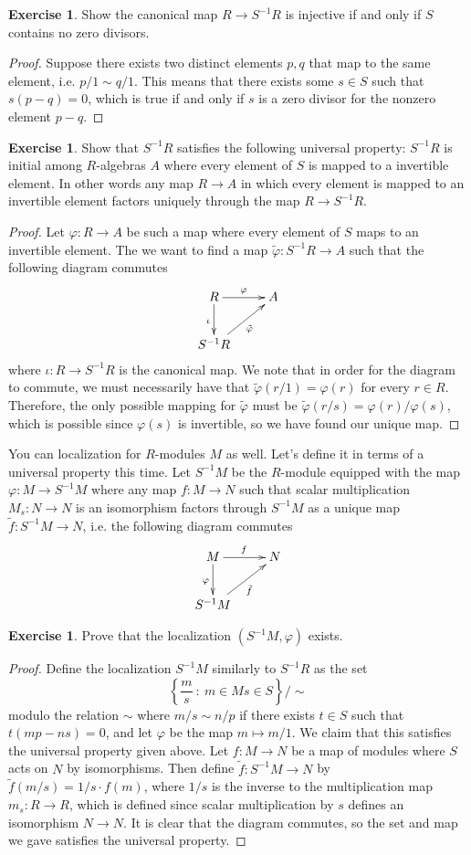 \documentclass[psamsfonts]{amsart}
\theoremstyle{definition}
\newtheorem{exer}[thm]{Exercise}
\theoremstyle{remark}
\newcommand{\inv}{^{-1}}
\newcommand{\set}[1]{\left\lbrace #1 \right\rbrace}
\begin{document}
%
\begin{exer}
Show the canonical map $R \to S\inv R$ is injective if and only if $S$ contains no zero divisors.
\end{exer}
%
\begin{proof}
Suppose there exists two distinct elements $p,q$ that map to the same element, i.e. $p/1 \sim q/1$. This means that there exists some $s \in S$ such that $s(p-q) = 0$, which is true if and only if $s$ is a zero divisor for the nonzero element $p-q$.
\end{proof}
%
\begin{exer}
Show that $S\inv R$ satisfies the following universal property: $S\inv R$ is initial among $R$-algebras $A$ where every element of $S$ is mapped to a invertible element. In other words any map $R \to A$ in which every element is mapped to an invertible element factors uniquely through the map $R \to S\inv R$.
\end{exer}
%
\begin{proof}
Let $\varphi : R \to A$ be such a map where every element of $S$ maps to an invertible element. The we want to find a map $\tilde{\varphi}: S\inv R \to A$ such that the following diagram commutes
$$\xymatrix{
R \ar[d]_{\iota}\ar[r]^{\varphi} & A \\
S\inv R \ar[ur]_{\tilde{\varphi}}
}$$
where $\iota : R \to S\inv R$ is the canonical map. We note that in order for the diagram to commute, we must necessarily have that $\tilde{\varphi}(r/1) = \varphi(r)$ for every $r \in R$. Therefore, the only possible mapping for $\tilde{\varphi}$ must be $\tilde{\varphi}(r/s) = \varphi(r) / \varphi(s)$, which is possible since $\varphi(s)$ is invertible, so we have found our unique map.
\end{proof}
You can localization for $R$-modules $M$ as well. Let's define it in terms of a universal property this time. Let $S\inv M$ be the $R$-module equipped with the map $\varphi : M \to S\inv M$ where any map $f: M \to N$ such that scalar multiplication $M_s: N \to N$ is an isomorphism factors through $S\inv M$ as a unique map $\tilde{f}: S\inv M \to N$, i.e. the following diagram commutes
$$\xymatrix{
M \ar[d]_{\varphi}\ar[r]^f & N \\
S\inv M \ar[ur]_{\tilde{f}}
}$$
%
\begin{exer}
Prove that the localization $(S\inv M, \varphi)$ exists.
\end{exer}
%
\begin{proof}
Define the localization $S\inv M$ similarly to $S\inv R$ as the set
$$\set{\frac{m}{s} ~:~ m \in M s \in S} / \sim $$
modulo the relation $\sim$ where $m/s \sim n/p$ if there exists $t \in S$ such that $t(mp - ns) = 0$, and let $\varphi$ be the map $m \mapsto m / 1$. We claim that this satisfies the universal property given above. Let $f: M \to N$ be a map of modules where $S$ acts on $N$ by isomorphisms. Then define $\tilde{f}: S\inv M \to N$ by $\tilde{f}(m/s) = 1/s \cdot f(m)$, where $1/s$ is the inverse to the multiplication map $m_s: R \to R$, which is defined since scalar multiplication by $s$ defines an isomorphism $N \to N$. It is clear that the diagram commutes, so the set and map we gave satisfies the universal property.
\end{proof}
\end{document}
